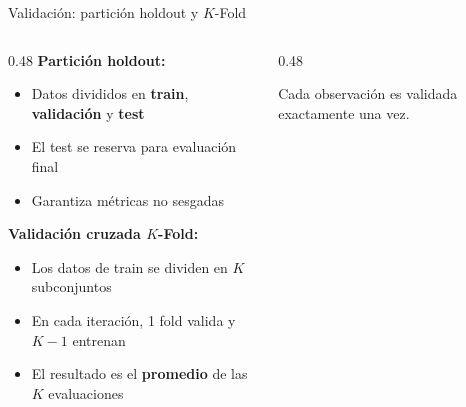 \documentclass[aspectratio=169, 11pt]{beamer}
\begin{document}
\begin{frame}{Validación: partición holdout y $K$-Fold}
  \begin{columns}[c]
    \begin{column}{0.48\textwidth}
      \textbf{Partición holdout:}
      \begin{itemize}
        \item Datos divididos en \textbf{train}, \textbf{validación} y \textbf{test}
        \item El test se reserva para evaluación final
        \item Garantiza métricas no sesgadas
      \end{itemize}

      \vspace{0.3cm}
      \textbf{Validación cruzada $K$-Fold:}
      \begin{itemize}
        \item Los datos de train se dividen en $K$ subconjuntos
        \item En cada iteración, 1 fold valida y $K{-}1$ entrenan
        \item El resultado es el \textbf{promedio} de las $K$ evaluaciones
      \end{itemize}
    \end{column}
    \begin{column}{0.48\textwidth}
      \centering
      \shorthandoff{>}
      \shorthandon{>}

      \vspace{0.2cm}
      {\scriptsize Cada observación es validada exactamente una vez.}
    \end{column}
  \end{columns}
\end{frame}
\end{document}
